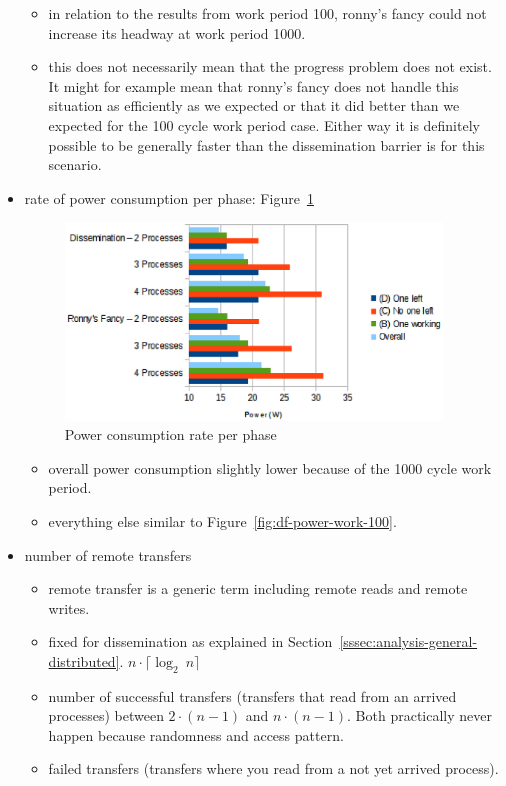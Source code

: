 \documentclass[a4paper, 10pt]{article}
\begin{document}
\begin{itemize}
\begin{itemize}
			\item in relation to the results from work period 100, ronny's fancy could not increase its headway at work period 1000.
			\item this does not necessarily mean that the progress problem does not exist. It might for example mean that ronny's fancy does not handle this situation as efficiently as we expected or that it did better than we expected for the 100 cycle work period case. Either way it is definitely possible to be generally faster than the dissemination barrier is for this scenario.
		\end{itemize}
	\item rate of power consumption per phase: Figure~\ref{fig:df-power-work-1000}
		\begin{figure}[htbp]
			\centering
			\includegraphics[width=10cm]{charts/df-power-work-1000}
			\caption{Power consumption rate per phase}
			\label{fig:df-power-work-1000}
		\end{figure}
		\begin{itemize}
			\item overall power consumption slightly lower because of the 1000 cycle work period.
			\item everything else similar to Figure~\ref{fig:df-power-work-100}.
		\end{itemize}
	\item number of remote transfers
		\begin{itemize}
			\item remote transfer is a generic term including remote reads and remote writes.
			\item fixed for dissemination as explained in Section~\ref{sssec:analysis-general-distributed}. $n \cdot \lceil \log _2~n \rceil$
			\item number of successful transfers (transfers that read from an arrived processes) between $2 \cdot (n-1)$ and $n \cdot (n-1)$. Both practically never happen because randomness and access pattern.
			\item failed transfers (transfers where you read from a not yet arrived process).

\end{itemize}
\end{itemize}
\end{document}
